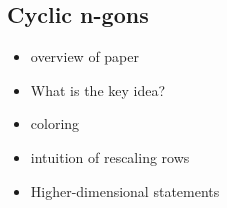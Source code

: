 \subsection{Cyclic n-gons}

\begin{itemize}
  \item overview of paper
  \item What is the key idea?
  \item coloring
  \item intuition of rescaling rows
  \item Higher-dimensional statements
\end{itemize}
